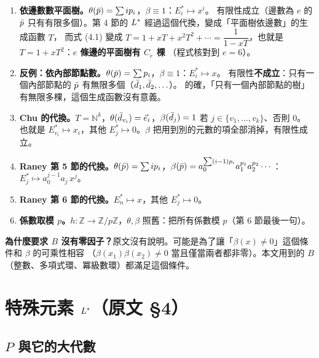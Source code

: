 \begin{exbox}[代換的例子（$S=P$，$T=\mathbb N$ 或 $\mathbb N^k$）]
\begin{enumerate}[leftmargin=1.6em]
  \item \textbf{依邊數數平面樹。}$\theta(\bar p)=\sum ip_i$，$\beta\equiv1$：$E_i^*\mapsto x^i$。
        有限性成立（邊數為 $e$ 的 $\bar p$ 只有有限多個）。第 4 節的 $L^{*}$ 經過這個代換，變成「平面樹依邊數」的生成函數 $T$，
        而式 (4.1) 變成 $T=1+xT+x^2T^2+\cdots=\dfrac{1}{1-xT}$，也就是 $T=1+xT^2$：\textbf{$e$ 條邊的平面樹有 $C_e$ 棵}
        （程式核對到 $e=6$）。
  \item \textbf{反例：依內部節點數。}$\theta(\bar p)=\sum p_i$，$\beta\equiv1$：$E_i^*\mapsto x$。
        有限性\textbf{不成立}：只有一個內部節點的 $\bar p$ 有無限多個（$\bar d_1,\bar d_2,\ldots$）。
        的確，「只有一個內部節點的樹」有無限多棵，這個生成函數沒有意義。
  \item \textbf{Chu 的代換。}$T=\mathbb N^k$，$\theta(\bar d_{v_i})=\vec e_i$，$\beta(\bar d_j)=1$ 若 $j\in\{v_1,\ldots,v_k\}$、否則 $0$。
        也就是 $E^*_{v_i}\mapsto x_i$，其他 $E_j^*\mapsto0$。$\beta$ 把用到別的元數的項全部消掉，有限性成立。
  \item \textbf{Raney 第 5 節的代換。}$\theta(\bar p)=\sum ip_i$，$\beta(\bar p)=a_0^{\sum(i-1)p_i}a_1^{p_1}a_2^{p_2}\cdots$：$E_j^*\mapsto a_0^{j-1}a_j\,x^j$。
  \item \textbf{Raney 第 6 節的代換。}$E_n^*\mapsto x$，其他 $E_j^*\mapsto0$。
  \item \textbf{係數取模 $p$。}$h:\mathbb Z\to\mathbb Z/p\mathbb Z$，$\theta,\beta$ 照舊：把所有係數模 $p$（第 6 節最後一句）。
\end{enumerate}
\end{exbox}

\textbf{為什麼要求 $B$ 沒有零因子？}原文沒有說明。可能是為了讓「$\beta(x)\neq0$」這個條件和 $\beta$ 的可乘性相容
（$\beta(x_1)\beta(x_2)\ne0$ 當且僅當兩者都非零）。本文用到的 $B$（整數、多項式環、冪級數環）都滿足這個條件。

\section{特殊元素 $L^{*}$（原文 §4）}\label{sec:lstar}

\subsection{$P$ 與它的大代數}


